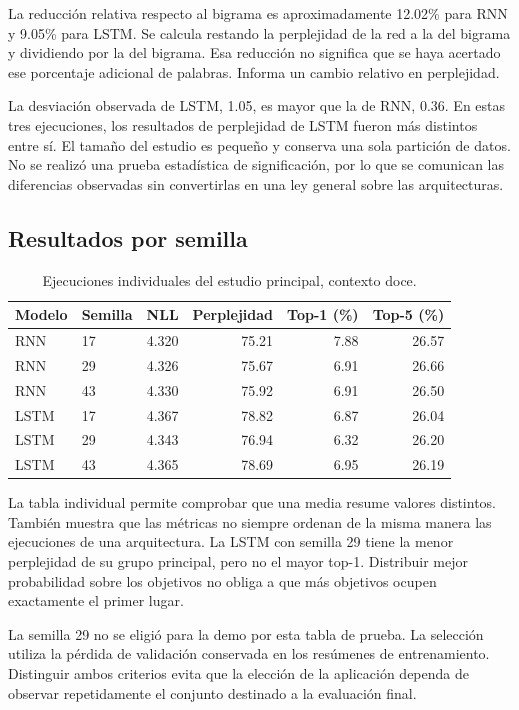 La reducción relativa respecto al bigrama es aproximadamente 12.02\% para RNN y 9.05\% para LSTM. Se calcula restando la perplejidad de la red a la del bigrama y dividiendo por la del bigrama. Esa reducción no significa que se haya acertado ese porcentaje adicional de palabras. Informa un cambio relativo en perplejidad.

La desviación observada de LSTM, 1.05, es mayor que la de RNN, 0.36. En estas tres ejecuciones, los resultados de perplejidad de LSTM fueron más distintos entre sí. El tamaño del estudio es pequeño y conserva una sola partición de datos. No se realizó una prueba estadística de significación, por lo que se comunican las diferencias observadas sin convertirlas en una ley general sobre las arquitecturas.

\subsection{Resultados por semilla}
\begin{table}[tb]
\caption{Ejecuciones individuales del estudio principal, contexto doce.}
\centering
\begin{tabular}{llrrrr}
\toprule Modelo & Semilla & NLL & Perplejidad & Top-1 (\%) & Top-5 (\%)\\\midrule
RNN & 17 & 4.320 & 75.21 & 7.88 & 26.57\\
RNN & 29 & 4.326 & 75.67 & 6.91 & 26.66\\
RNN & 43 & 4.330 & 75.92 & 6.91 & 26.50\\
LSTM & 17 & 4.367 & 78.82 & 6.87 & 26.04\\
LSTM & 29 & 4.343 & 76.94 & 6.32 & 26.20\\
LSTM & 43 & 4.365 & 78.69 & 6.95 & 26.19\\\bottomrule
\end{tabular}
\end{table}

La tabla individual permite comprobar que una media resume valores distintos. También muestra que las métricas no siempre ordenan de la misma manera las ejecuciones de una arquitectura. La LSTM con semilla 29 tiene la menor perplejidad de su grupo principal, pero no el mayor top-1. Distribuir mejor probabilidad sobre los objetivos no obliga a que más objetivos ocupen exactamente el primer lugar.

La semilla 29 no se eligió para la demo por esta tabla de prueba. La selección utiliza la pérdida de validación conservada en los resúmenes de entrenamiento. Distinguir ambos criterios evita que la elección de la aplicación dependa de observar repetidamente el conjunto destinado a la evaluación final.

